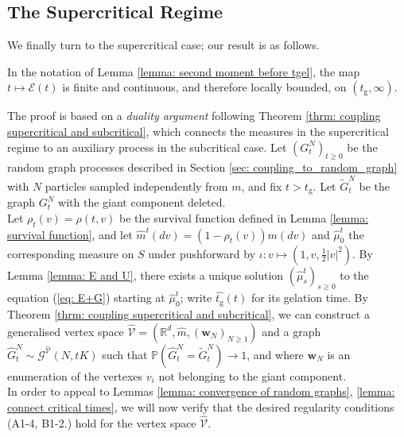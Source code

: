 \subsection{The Supercritical Regime} We finally turn to the supercritical case; our result is as follows. 
\begin{lemma}\label{lemma: second moment finite after tgel} In the notation of Lemma \ref{lemma: second moment before tgel}, the map $t\mapsto \mathcal{E}(t)$ is finite and continuous, and therefore locally bounded, on  $(t_\mathrm{g},\infty)$. \end{lemma} 
The proof is based on a \emph{duality argument} following Theorem \ref{thrm: coupling supercritical and subcritical}, which connects the measures in the supercritical regime to an auxiliary process in the subcritical case.  Let $(G^N_t)_{t\geq 0}$ be the random graph processes described in Section  \ref{sec: coupling_to_random_graph} with $N$ particles sampled independently from $m$, and fix $t>t_\mathrm{g}$. Let $\widetilde{G}^N_{t}$ be the graph $G^N_{t}$ with the giant component deleted. \medskip \\ 
Let $\rho_{t}(v)=\rho(t, v)$ be the survival function defined in Lemma \ref{lemma: survival function}, and let $\widehat{m}^t(dv)=(1-\rho_{t}(v))m(dv)$ and $\widehat{\mu}^t_0$ the corresponding measure on $S$ under pushforward by $\iota: v\mapsto (1, v, \frac{1}{2}|v|^2)$. By Lemma \ref{lemma: E and U}, there exists a unique solution $(\widehat{\mu}^t_s)_{s\geq 0}$ to the equation (\ref{eq: E+G}) starting at $\widehat{\mu}^t_0$; write $\widehat{t_\mathrm{g}}(t)$ for its gelation time. By Theorem \ref{thrm: coupling supercritical and subcritical}, we can construct a generalised vertex space $\widehat{\mathcal{V}}=(\mathbb{R}^d, \widehat{m}, (\mathbf{w}_N)_{N\ge 1})$ and a graph $\widehat{G}^N_{t}\sim \mathcal{G}^{\widehat{\mathcal{V}}}(N,tK)$ such that $\mathbb{P}(\widehat{G}^N_{t}=\widetilde{G}^N_{t})\rightarrow 1$, and where $\mathbf{w}_N$ is an enumeration of the vertexes $v_i$ not belonging to the giant component. 
\medskip \\
In order to appeal to Lemmas \ref{lemma: convergence of random graphs}, \ref{lemma: connect critical times}, we will now verify that the desired regularity conditions (A1-4, B1-2.) hold for the vertex space $\widehat{\mathcal{V}}$.
